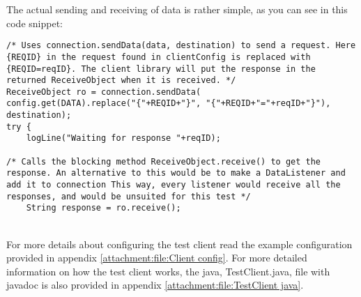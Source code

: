     The actual sending and receiving of data is rather simple, as you can see in this code snippet:
    \lstset{language=Java, style=eclipse}
    \lstset{frame=single}
    \lstset{breaklines=true}
    \lstset{showstringspaces=false}
    \begin{lstlisting}
/* Uses connection.sendData(data, destination) to send a request. Here {REQID} in the request found in clientConfig is replaced with {REQID=reqID}. The client library will put the response in the returned ReceiveObject when it is received. */
ReceiveObject ro = connection.sendData(
config.get(DATA).replace("{"+REQID+"}", "{"+REQID+"="+reqID+"}"), destination);
try {
    logLine("Waiting for response "+reqID);

/* Calls the blocking method ReceiveObject.receive() to get the response. An alternative to this would be to make a DataListener and add it to connection This way, every listener would receive all the responses, and would be unsuited for this test */
    String response = ro.receive();
    \end{lstlisting}
    \\
    For more details about configuring the test client read the example configuration provided in appendix \ref{attachment:file:Client config}. For more detailed information on how the test client works, the java, TestClient.java, file with javadoc is also provided in appendix \ref{attachment:file:TestClient java}.

